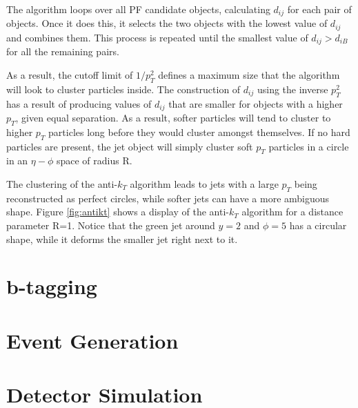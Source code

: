The algorithm loops over all PF candidate objects, calculating $d_{ij}$ for each pair of objects. Once it does this, it selects the two objects with the lowest value of $d_{ij}$ and combines them. This process is repeated until the smallest value of $d_{ij}>d_{iB}$ for all the remaining pairs. 

As a result, the cutoff limit of $1/p_{T}^{2}$ defines a maximum size that the algorithm will look to cluster particles inside. The construction of $d_{ij}$ using the inverse $p_{T}^{2}$ has a result of producing values of $d_{ij}$ that are smaller for objects with a higher $p_{T}$, given equal separation. As a result, softer particles will tend to cluster to higher $p_{T}$ particles long before they would cluster amongst themselves. If no hard particles are present, the jet object will simply cluster soft $p_{T}$ particles in a circle in an $\eta-\phi$ space of radius R.

The clustering of the anti-$k_{T}$ algorithm leads to jets with a large $p_{T}$ being reconstructed as perfect circles, while softer jets can have a more ambiguous shape. Figure \ref{fig:antikt} shows a display of the anti-$k_{T}$ algorithm for a distance parameter R=1. Notice that the green jet around $y=2$ and $\phi=5$ has a circular shape, while it deforms the smaller jet right next to it.


\section{b-tagging}

\section{Event Generation}

\section{Detector Simulation}


